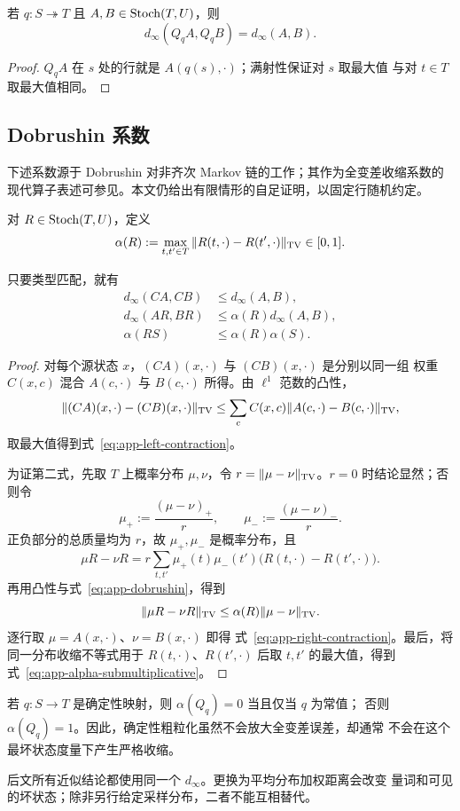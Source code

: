 \begin{lemma}[满射确定性前复合保持行最大值]
\label{lem:app-surjective-pullback}
若 $q:S\twoheadrightarrow T$ 且 $A,B\in\operatorname{Stoch}(T,U)$，则
\[
  d_\infty(Q_qA,Q_qB)=d_\infty(A,B).
\]
\end{lemma}

\begin{proof}
$Q_qA$ 在 $s$ 处的行就是 $A(q(s),\cdot)$；满射性保证对 $s$ 取最大值
与对 $t\in T$ 取最大值相同。
\end{proof}

\subsection{Dobrushin 系数}

下述系数源于 Dobrushin 对非齐次 Markov 链的工作；其作为全变差收缩系数的现代算子表述可参见\citet{Dobrushin1956,GaubertQu2015}。本文仍给出有限情形的自足证明，以固定行随机约定。

对 $R\in\operatorname{Stoch}(T,U)$，定义
\begin{equation}
  \alpha(R):=\max_{t,t'\in T}
  \|R(t,\cdot)-R(t',\cdot)\|_{\operatorname{TV}}\in[0,1].
  \label{eq:app-dobrushin}
\end{equation}

\begin{lemma}
\label{lem:app-tv-contraction}
只要类型匹配，就有
\begin{align}
  d_\infty(CA,CB)&\le d_\infty(A,B),
  \label{eq:app-left-contraction}\\
  d_\infty(AR,BR)&\le \alpha(R)d_\infty(A,B),
  \label{eq:app-right-contraction}\\
  \alpha(RS)&\le\alpha(R)\alpha(S).
  \label{eq:app-alpha-submultiplicative}
\end{align}
\end{lemma}

\begin{proof}
对每个源状态 $x$，$(CA)(x,\cdot)$ 与 $(CB)(x,\cdot)$ 是分别以同一组
权重 $C(x,c)$ 混合 $A(c,\cdot)$ 与 $B(c,\cdot)$ 所得。由 $\ell^1$
范数的凸性，
\[
 \|(CA)(x,\cdot)-(CB)(x,\cdot)\|_{\operatorname{TV}}
 \le \sum_c C(x,c)\|A(c,\cdot)-B(c,\cdot)\|_{\operatorname{TV}},
\]
取最大值得到式~\eqref{eq:app-left-contraction}。

为证第二式，先取 $T$ 上概率分布 $\mu,\nu$，令
$r=\|\mu-\nu\|_{\operatorname{TV}}$。$r=0$ 时结论显然；否则令
\[
  \mu_+:=\frac{(\mu-\nu)_+}{r},
  \qquad
  \mu_-:=\frac{(\mu-\nu)_-}{r}.
\]
正负部分的总质量均为 $r$，故 $\mu_+,\mu_-$ 是概率分布，且
\[
 \mu R-\nu R
 =r\sum_{t,t'}\mu_+(t)\mu_-(t')
   \bigl(R(t,\cdot)-R(t',\cdot)\bigr).
\]
再用凸性与式~\eqref{eq:app-dobrushin}，得到
\[
  \|\mu R-\nu R\|_{\operatorname{TV}}
  \le\alpha(R)\|\mu-\nu\|_{\operatorname{TV}}.
\]
逐行取 $\mu=A(x,\cdot)$、$\nu=B(x,\cdot)$ 即得
式~\eqref{eq:app-right-contraction}。最后，将同一分布收缩不等式用于
$R(t,\cdot)$、$R(t',\cdot)$ 后取 $t,t'$ 的最大值，得到
式~\eqref{eq:app-alpha-submultiplicative}。
\end{proof}

\begin{remark}
若 $q:S\to T$ 是确定性映射，则 $\alpha(Q_q)=0$ 当且仅当 $q$ 为常值；
否则 $\alpha(Q_q)=1$。因此，确定性粗粒化虽然不会放大全变差误差，却通常
不会在这个最坏状态度量下产生严格收缩。
\end{remark}

后文所有近似结论都使用同一个 $d_\infty$。更换为平均分布加权距离会改变
量词和可见的坏状态；除非另行给定采样分布，二者不能互相替代。
